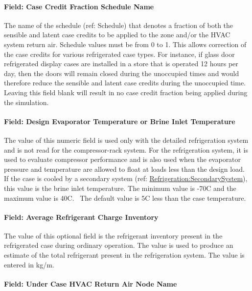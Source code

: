 \paragraph{Field: Case Credit Fraction Schedule Name}\label{field-case-credit-fraction-schedule-name}

The name of the schedule (ref: Schedule) that denotes a fraction of both the sensible and latent case credits to be applied to the zone and/or the HVAC system return air. Schedule values must be from 0 to 1. This allows correction of the case credits for various refrigerated case types. For instance, if glass door refrigerated display cases are installed in a store that is operated 12 hours per day, then the doors will remain closed during the unoccupied times and would therefore reduce the sensible and latent case credits during the unoccupied time. Leaving this field blank will result in no case credit fraction being applied during the simulation.

\paragraph{Field: Design Evaporator Temperature or Brine Inlet Temperature}\label{field-design-evaporator-temperature-or-brine-inlet-temperature}

The value of this numeric field is used only with the detailed refrigeration system and is not read for the compressor-rack system. For the refrigeration system, it is used to evaluate compressor performance and is also used when the evaporator pressure and temperature are allowed to float at loads less than the design load. If the case is cooled by a secondary system (ref: \hyperref[refrigerationsecondarysystem]{Refrigeration:SecondarySystem}), this value is the brine inlet temperature. The minimum value is -70C and the maximum value is 40C.~ The default value is 5C less than the case temperature.

\paragraph{Field: Average Refrigerant Charge Inventory}\label{field-average-refrigerant-charge-inventory}

The value of this optional field is the refrigerant inventory present in the refrigerated case during ordinary operation. The value is used to produce an estimate of the total refrigerant present in the refrigeration system. The value is entered in kg/m.

\paragraph{Field: Under Case HVAC Return Air Node Name}\label{under-case-hvac-return-air-node-name}

